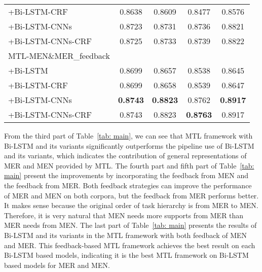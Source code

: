 \begin{table*}[tb]
\begin{tabular}{l|cc|cc}
		+Bi-LSTM-CRF      &0.8638&0.8609&0.8477&0.8576\\
		+Bi-LSTM-CNNs     &0.8723&0.8731&0.8736&0.8821\\
		+Bi-LSTM-CNNs-CRF &0.8725&0.8733&0.8739&0.8822\\
		\hline
		MTL-MEN\&MER\_feedback & &&    & \\
		\hdashline
		+Bi-LSTM          &0.8699&0.8657&0.8538&0.8645\\
		+Bi-LSTM-CRF      &0.8699&0.8658&0.8539&0.8647\\
		+Bi-LSTM-CNNs     &\textbf{0.8743}&\textbf{0.8823}&0.8762&\textbf{0.8917}\\
		+Bi-LSTM-CNNs-CRF &0.8743&0.8823 &\textbf{0.8763}&0.8917\\
		\hline
	\end{tabular}
	\vspace{-0.1in}	
	\caption{F1 score of medical named entity recognition and normalization on two corpora.}\label{tab: main}
	\vspace{-0.15in}
\end{table*}

From the third part of Table~\ref{tab: main}, we can see that MTL framework with Bi-LSTM and its variants significantly outperforms the pipeline use of Bi-LSTM and its variants, which indicates the contribution of general representations of MER and MEN provided by MTL.
The fourth part and fifth part of Table~\ref{tab: main} present the improvements by incorporating the feedback from MEN and the feedback from MER. Both feedback strategies can improve the performance of MER and MEN on both corpora, but the feedback from MER performs better. 
It makes sense because the original order of task hierarchy is from MER to MEN. Therefore, it is very natural that MEN needs more supports from MER than MER needs from MEN.
The last part of Table~\ref{tab: main} presents the results of Bi-LSTM and its variants in the MTL framework with both feedback of MEN and MER. This feedback-based MTL framework achieves the best result on each Bi-LSTM based models, indicating it is the best MTL framework on Bi-LSTM based models for MER and MEN.

